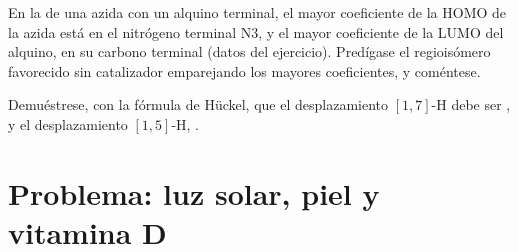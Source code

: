 \begin{exercise}[$\star\star\star$]\label{exo:b3:pericyclic:11}
En la  de una azida con un alquino terminal, el mayor
coeficiente de la HOMO de la azida está en el nitrógeno terminal N3, y el mayor
coeficiente de la LUMO del alquino, en su carbono terminal (datos del ejercicio).
Predígase el regioisómero favorecido sin catalizador emparejando los mayores
coeficientes, y coméntese.
\end{exercise}

\begin{exercise}[$\star\star\star$]\label{exo:b3:pericyclic:12}
Demuéstrese, con la fórmula de Hückel, que el desplazamiento $[1,7]$-H debe ser ,
y el desplazamiento $[1,5]$-H, .
\end{exercise}

\clearpage
\enlargethispage{3\baselineskip}
\section{Problema: luz solar, piel y vitamina D}

